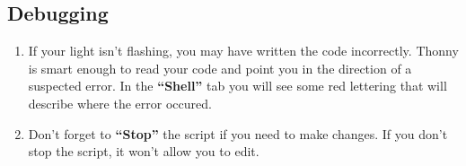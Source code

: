 \documentclass{article}\usepackage[]{graphicx}\usepackage[]{color}
\begin{document}
\subsection{Debugging}
\begin{enumerate}
\item If your light isn't flashing, you may have written the code incorrectly. Thonny is smart enough to read your code and point you in the direction of a suspected error. In the \textbf{``Shell''} tab you will see some red lettering that will describe where the error occured.
\item Don't forget to \textbf{``Stop''} the script if you need to make changes. If you don't stop the script, it won't allow you to edit.
\end{enumerate}
\end{document}
